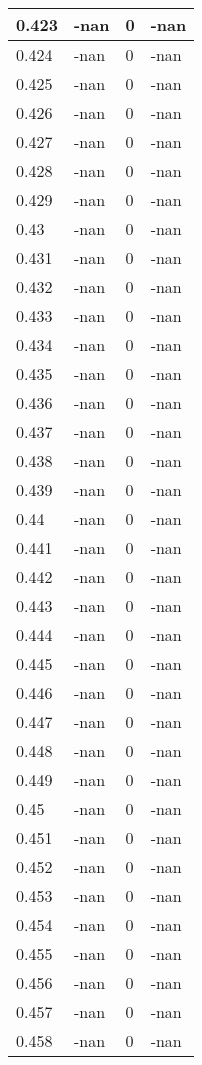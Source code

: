 \documentclass[a4paper,14pt]{extarticle}
\begin{document}
\begin{longtable}{||m{3cm}||m{3cm}|m{3cm}||m{3cm}||}
\hline
0.423 & -nan & 0 & -nan\\
\hline
0.424 & -nan & 0 & -nan\\
\hline
0.425 & -nan & 0 & -nan\\
\hline
0.426 & -nan & 0 & -nan\\
\hline
0.427 & -nan & 0 & -nan\\
\hline
0.428 & -nan & 0 & -nan\\
\hline
0.429 & -nan & 0 & -nan\\
\hline
0.43 & -nan & 0 & -nan\\
\hline
0.431 & -nan & 0 & -nan\\
\hline
0.432 & -nan & 0 & -nan\\
\hline
0.433 & -nan & 0 & -nan\\
\hline
0.434 & -nan & 0 & -nan\\
\hline
0.435 & -nan & 0 & -nan\\
\hline
0.436 & -nan & 0 & -nan\\
\hline
0.437 & -nan & 0 & -nan\\
\hline
0.438 & -nan & 0 & -nan\\
\hline
0.439 & -nan & 0 & -nan\\
\hline
0.44 & -nan & 0 & -nan\\
\hline
0.441 & -nan & 0 & -nan\\
\hline
0.442 & -nan & 0 & -nan\\
\hline
0.443 & -nan & 0 & -nan\\
\hline
0.444 & -nan & 0 & -nan\\
\hline
0.445 & -nan & 0 & -nan\\
\hline
0.446 & -nan & 0 & -nan\\
\hline
0.447 & -nan & 0 & -nan\\
\hline
0.448 & -nan & 0 & -nan\\
\hline
0.449 & -nan & 0 & -nan\\
\hline
0.45 & -nan & 0 & -nan\\
\hline
0.451 & -nan & 0 & -nan\\
\hline
0.452 & -nan & 0 & -nan\\
\hline
0.453 & -nan & 0 & -nan\\
\hline
0.454 & -nan & 0 & -nan\\
\hline
0.455 & -nan & 0 & -nan\\
\hline
0.456 & -nan & 0 & -nan\\
\hline
0.457 & -nan & 0 & -nan\\
\hline
0.458 & -nan & 0 & -nan\\

\end{longtable}
\end{document}
